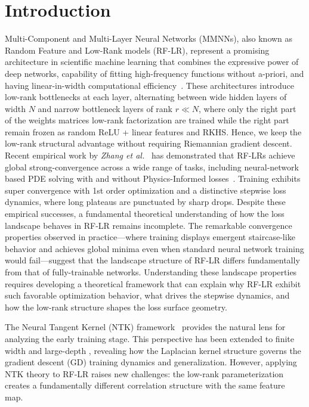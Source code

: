 
\section{Introduction}

Multi-Component and Multi-Layer Neural Networks (MMNNs), also known as Random Feature and Low-Rank  models (RF-LR), represent a promising
 architecture in scientific machine learning that combines the expressive power of deep networks, capability of fitting high-frequency functions without
 a-priori, and having linear-in-width computational efficiency~\cite{zhang2025structuredbalancedmulticomponentmultilayer}. 
 These architectures introduce low-rank bottlenecks
  at each layer, alternating between wide hidden layers of width \( N \) and narrow bottleneck layers of rank \( r \ll N \), 
  where only the right part of the weights matrices low-rank factorization are trained 
while the right part remain frozen as random ReLU + linear features and RKHS. Hence, we keep the low-rank structural advantage \cite{kamalakara2022exploringlowranktraining} without requiring Riemannian gradient descent.
Recent empirical work by 
 \textit{Zhang et al.}~\cite{zhang2025structuredbalancedmulticomponentmultilayer} has demonstrated that 
 RF-LRs achieve global strong-convergence across a wide range of tasks, including neural-network based PDE solving with and without Physics-Informed losses~\cite{raissi2017physicsinformeddeeplearning}. 
 Training exhibits super convergence with 1st order optimization and a distinctive stepwise loss dynamics, where long plateaus are punctuated by sharp drops.
Despite these empirical successes, a fundamental theoretical understanding of how the loss landscape behaves in RF-LR remains incomplete. The remarkable convergence properties observed in practice—where training displays emergent staircase-like behavior and achieves global minima even when standard neural network training would fail—suggest that the landscape structure of RF-LR differs fundamentally from that of fully-trainable networks. Understanding these landscape properties requires developing a theoretical framework that can explain why RF-LR exhibit such favorable optimization behavior, what drives the stepwise dynamics, and how the low-rank structure shapes the loss surface geometry.

The Neural Tangent Kernel (NTK) framework~\cite{jacot2018neural} provides the natural lens 
for analyzing the early training stage. This perspective has been extended to finite width \cite{huang2019dynamicsdeepneuralnetworks,dyer2019asymptoticswidenetworksfeynman} and large-depth \cite{guillen2025finitewidthneuraltangentkernels,yang2023tensorprogramsvifeature,terjek2022depth}, 
revealing how the Laplacian kernel structure governs the gradient descent (GD) training dynamics and generalization. 
However, applying NTK theory to RF-LR raises new challenges: the low-rank parameterization creates a fundamentally different correlation structure with the same feature map.


